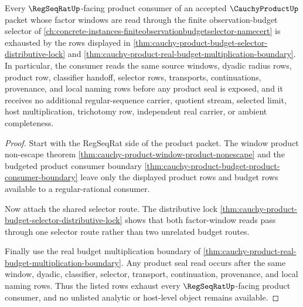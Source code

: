 \begin{theorem}
\label{thm:cauchy-product-regseqrat-product-seal-coverage}
Every $\RegSeqRatUp$-facing product consumer of an accepted $\CauchyProductUp$ packet whose factor windows are read through the finite observation-budget selector of \autoref{ch:concrete-instances-finiteobservationbudgetselector-namecert} is exhausted by the rows displayed in \autoref{thm:cauchy-product-budget-selector-distributive-lock} and \autoref{thm:cauchy-product-real-budget-multiplication-boundary}. In particular, the consumer reads the same source windows, dyadic radius rows, product row, classifier handoff, selector rows, transports, continuations, provenance, and local naming rows before any product seal is exposed, and it receives no additional regular-sequence carrier, quotient stream, selected limit, host multiplication, trichotomy row, independent real carrier, or ambient completeness.
\end{theorem}
\begin{proof}
Start with the RegSeqRat side of the product packet. The window product non-escape theorem \autoref{thm:cauchy-product-window-product-nonescape} and the budgeted product consumer boundary \autoref{thm:cauchy-product-budget-product-consumer-boundary} leave only the displayed product rows and budget rows available to a regular-rational consumer.

Now attach the shared selector route. The distributive lock \autoref{thm:cauchy-product-budget-selector-distributive-lock} shows that both factor-window reads pass through one selector route rather than two unrelated budget routes.

Finally use the real budget multiplication boundary of \autoref{thm:cauchy-product-real-budget-multiplication-boundary}. Any product seal read occurs after the same window, dyadic, classifier, selector, transport, continuation, provenance, and local naming rows. Thus the listed rows exhaust every $\RegSeqRatUp$-facing product consumer, and no unlisted analytic or host-level object remains available.
\end{proof}

